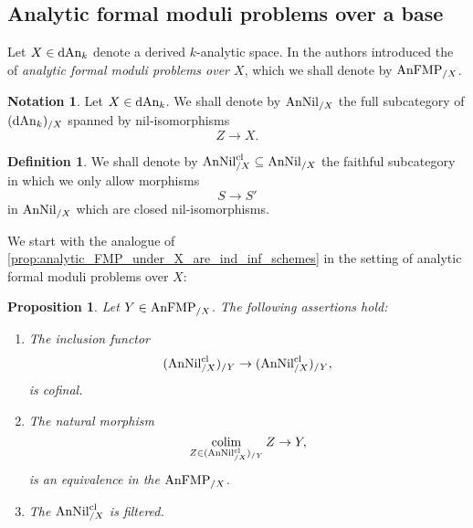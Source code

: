 \documentclass[10pt,a4paper,reqno]{amsart} %
\theoremstyle{plain}
\newtheorem{prop}[thm]{Proposition}
\theoremstyle{definition}
\newtheorem{defin}[thm]{Definition}
\newtheorem{notation}[thm]{Notation}
\theoremstyle{remark}
\numberwithin{equation}{section}
\begin{document}
\subsection{Analytic formal moduli problems over a base}
Let $X \in \mathrm{dAn}_k$ denote a derived $k$-analytic space. In \cite[Definition 6.11]{Porta_Yu_NQK}
the authors introduced the \infcat of \emph{analytic formal moduli problems over $X$}, which we shall denote by $\mathrm{AnFMP}_{/X}$.

\begin{notation}
    Let $X \in \mathrm{dAn}_k$. We shall denote by $\mathrm{AnNil}_{/X}$ the full subcategory of $(\mathrm{dAn}_k)_{/X}$ spanned by nil-isomorphisms
        \[
            Z \to X.  
        \]
\end{notation}

\begin{defin}
    We shall denote by $\mathrm{AnNil}_{/X}^{\mathrm{cl}} \subseteq \mathrm{AnNil}_{/X}$ the faithful subcategory in which we only allow morphisms
        \[
            S \to S'  
        \]
    in $\mathrm{AnNil}_{/X}$ which are closed nil-isomorphisms.
\end{defin}

We start with the analogue of \cref{prop:analytic_FMP_under_X_are_ind_inf_schemes} in the setting of analytic formal moduli problems over $X$:

\begin{prop} \label{prop:required_conditions_for_formal_moduli_problems}
    Let $Y \in \mathrm{AnFMP}_{/X}$. The following assertions hold:
    \begin{enumerate}
        \item The inclusion functor
            \[
                (\mathrm{AnNil}^{\mathrm{cl}}_{/X})_{/Y}  \to (\mathrm{AnNil}^{\mathrm{cl}}_{/X})_{/Y},
            \]
        is cofinal.
        \item The natural morphism
            \[
                \operatorname*{colim}_{Z \in (\mathrm{AnNil}^{\mathrm{cl}}_{/X})_{/Y}}  Z \to Y,
            \]
        is an equivalence in the \infcat $\mathrm{AnFMP}_{/X}$.
        \item The \infcat $\mathrm{AnNil}_{/X}^{\mathrm{cl}}$ is filtered.
    \end{enumerate}
\end{prop}
\end{document}
